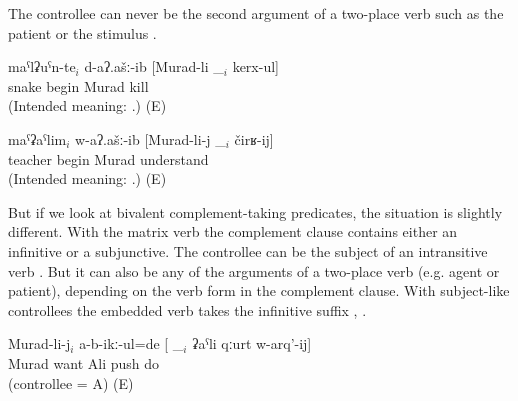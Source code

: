 The controllee can never be the second argument of a two-place verb such as the patient  or the stimulus . 
%
\begin{exe}
	\ex	\label{ex:Snakes, Murad, teacher ungrammatical@43}
	\begin{xlist}
		\ex	\label{ex:The snakes began to be killed by Murad@43a}
		\gll	{*}	maˁlʡuˁn-te$_{i}$	d-aʔ.ašː-ib	[Murad-li	\_$_{i}$	kerx-ul]\\
			{}	snake	begin	Murad		kill\\
		\glt	(Intended meaning: .) (E)

		\ex	\label{ex:The teacher began to be understood by Murad@43bA}
		\gll	{*}	maˁʡaˁlim$_{i}$	w-aʔ.ašː-ib	[Murad-li-j	\_$_{i}$	čirʁ-ij]\\
			{}	teacher	begin	Murad		understand\\
		\glt	(Intended meaning: .) (E)
	\end{xlist}
\end{exe}

But if we look at bivalent complement-taking predicates, the situation is slightly different. With the matrix verb   the complement clause contains either an infinitive or a subjunctive. The controllee can be the subject of an intransitive verb . But it can also be any of the arguments of a two-place verb (e.g. agent or patient), depending on the verb form in the complement clause. With subject-like controllees the embedded verb takes the infinitive suffix , .
%
\begin{exe}
	\ex	\label{ex:Murad did not want to push Ali@44}
	\gll	Murad-li-j$_{i}$	a-b-ikː-ul=de	[ \_$_{i}$	ʡaˁli	qːurt	w-arq'-ij]\\
		Murad	want	{} 	Ali	push	do\\
	\glt	{} (controllee = A) (E)
\end{exe}

